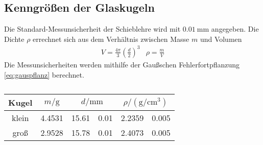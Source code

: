 \subsection{Kenngrößen der Glaskugeln}

Die Standard-Messunsicherheit der Schieblehre wird mit $\qty{0.01}{\mm}$ angegeben.
Die Dichte $\rho$ errechnet sich aus dem Verhältnis zwischen Masse $m$ und Volumen
\begin{align*}
    V = \frac{4 \pi}{3} \left(\frac{d}{2}\right)^3 & \rho = \frac{m}{V}
\end{align*}
Die Messunsicherheiten werden mithilfe der Gaußschen Fehlerfortpflanzung \ref{eq:gauspflanz} berechnet.
%

\begin{table}
    \caption{}
    \label{tab:Dichten}
    \centering
    \begin{tabular}[]{S S[table-format=1.4] S[table-format=2.2] @{${}\pm{}$} S[table-format=0.2] S[table-format=1.4] @{${}\pm{}$} S[table-format=0.2]}
        \toprule
        {Kugel} & {$m / \unit{\g}$} &   &  \\
        \midrule
        {klein} & 4.4531 & 15.61 & 0.01 & 2.2359 & 0.005\\
        {groß}  & 2.9528 & 15.78 & 0.01 & 2.4073 & 0.005\\
        \bottomrule 

    \end{tabular}
\end{table}


